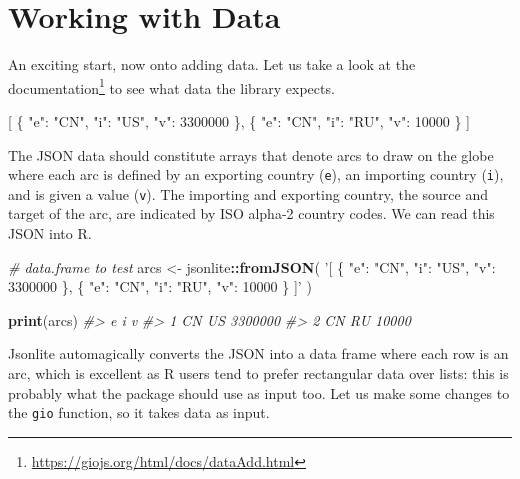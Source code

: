 \documentclass[10pt,]{krantz}
\makeatletter
\newenvironment{Shaded}{\begin{snugshade}}{\end{snugshade}}
\newcommand{\CommentTok}[1]{\textcolor[rgb]{0.37,0.37,0.37}{\textit{#1}}}
\newcommand{\DataTypeTok}[1]{\textcolor[rgb]{0.27,0.27,0.27}{#1}}
\newcommand{\DecValTok}[1]{\textcolor[rgb]{0.06,0.06,0.06}{#1}}
\newcommand{\FunctionTok}[1]{\textcolor[rgb]{0,0,0}{#1}}
\newcommand{\KeywordTok}[1]{\textcolor[rgb]{0.27,0.27,0.27}{\textbf{#1}}}
\newcommand{\NormalTok}[1]{#1}
\newcommand{\OperatorTok}[1]{\textcolor[rgb]{0.43,0.43,0.43}{\textbf{#1}}}
\newcommand{\OtherTok}[1]{\textcolor[rgb]{0.37,0.37,0.37}{#1}}
\newcommand{\StringTok}[1]{\textcolor[rgb]{0.5,0.5,0.5}{#1}}
\renewcommand{\href}[2]{#2\footnote{\url{#1}}}
\newenvironment{kframe}{%
\medskip{}
\setlength{\fboxsep}{.8em}
 \def\at@end@of@kframe{}%
 \ifinner\ifhmode%
  \def\at@end@of@kframe{\end{minipage}}%
  \begin{minipage}{\columnwidth}%
 \fi\fi%
 \def\FrameCommand##1{\hskip\@totalleftmargin \hskip-\fboxsep
 \colorbox{shadecolor}{##1}\hskip-\fboxsep
     \hskip-\linewidth \hskip-\@totalleftmargin \hskip\columnwidth}%
 \MakeFramed {\advance\hsize-\width
   \@totalleftmargin\z@ \linewidth\hsize
   \@setminipage}}%
 {\par\unskip\endMakeFramed%
 \at@end@of@kframe}
\renewenvironment{Shaded}{\begin{kframe}}{\end{kframe}}
\makeatother
\begin{document}
\hypertarget{widgets-full-data}{%
\section{Working with Data}\label{widgets-full-data}}

An exciting start, now onto adding data. Let us take a look at the \href{https://giojs.org/html/docs/dataAdd.html}{documentation} to see what data the library expects.

\begin{Shaded}
\begin{Highlighting}[]
\OtherTok{[}
  \FunctionTok{\{}
    \DataTypeTok{"e"}\FunctionTok{:} \StringTok{"CN"}\FunctionTok{,}
    \DataTypeTok{"i"}\FunctionTok{:} \StringTok{"US"}\FunctionTok{,}
    \DataTypeTok{"v"}\FunctionTok{:} \DecValTok{3300000}
  \FunctionTok{\}}\OtherTok{,}
  \FunctionTok{\{}
    \DataTypeTok{"e"}\FunctionTok{:} \StringTok{"CN"}\FunctionTok{,}
    \DataTypeTok{"i"}\FunctionTok{:} \StringTok{"RU"}\FunctionTok{,}
    \DataTypeTok{"v"}\FunctionTok{:} \DecValTok{10000}
  \FunctionTok{\}}
\OtherTok{]}
\end{Highlighting}
\end{Shaded}

The JSON data should constitute arrays that denote arcs to draw on the globe where each arc is defined by an exporting country (\texttt{e}), an importing country (\texttt{i}), and is given a value (\texttt{v}). The importing and exporting country, the source and target of the arc, are indicated by ISO alpha-2 country codes. We can read this JSON into R.

\begin{Shaded}
\begin{Highlighting}[]
\CommentTok{# data.frame to test}
\NormalTok{arcs <-}\StringTok{ }\NormalTok{jsonlite}\OperatorTok{::}\KeywordTok{fromJSON}\NormalTok{(}
  \StringTok{'[}
\StringTok{    \{}
\StringTok{      "e": "CN",}
\StringTok{      "i": "US",}
\StringTok{      "v": 3300000}
\StringTok{    \},}
\StringTok{    \{}
\StringTok{      "e": "CN",}
\StringTok{      "i": "RU",}
\StringTok{      "v": 10000}
\StringTok{    \}}
\StringTok{  ]'}
\NormalTok{)}

\KeywordTok{print}\NormalTok{(arcs)}
\CommentTok{#>    e  i       v}
\CommentTok{#> 1 CN US 3300000}
\CommentTok{#> 2 CN RU   10000}
\end{Highlighting}
\end{Shaded}

Jsonlite automagically converts the JSON into a data frame where each row is an arc, which is excellent as R users tend to prefer rectangular data over lists: this is probably what the package should use as input too. Let us make some changes to the \texttt{gio} function, so it takes data as input.
\end{document}

